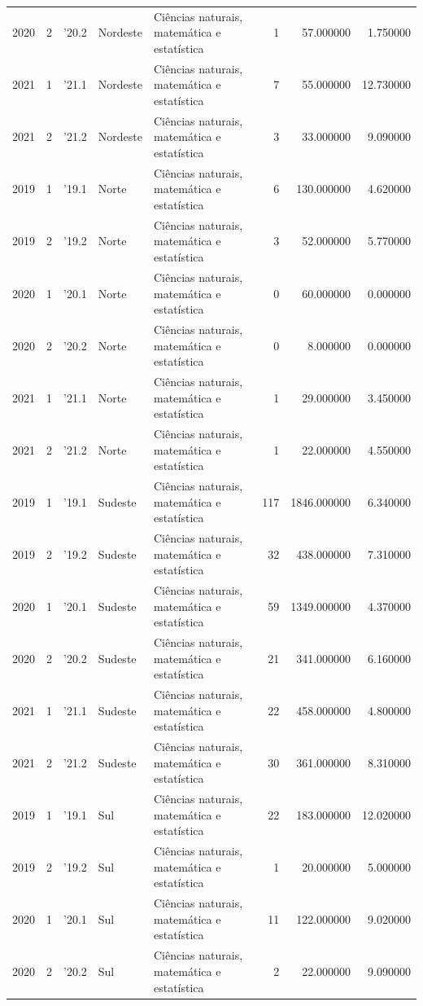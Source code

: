 \begin{longtable}{rrlllrrr}
2020 & 2 & '20.2 & Nordeste & Ciências naturais, matemática e estatística & 1 & 57.000000 & 1.750000 \\
2021 & 1 & '21.1 & Nordeste & Ciências naturais, matemática e estatística & 7 & 55.000000 & 12.730000 \\
2021 & 2 & '21.2 & Nordeste & Ciências naturais, matemática e estatística & 3 & 33.000000 & 9.090000 \\
2019 & 1 & '19.1 & Norte & Ciências naturais, matemática e estatística & 6 & 130.000000 & 4.620000 \\
2019 & 2 & '19.2 & Norte & Ciências naturais, matemática e estatística & 3 & 52.000000 & 5.770000 \\
2020 & 1 & '20.1 & Norte & Ciências naturais, matemática e estatística & 0 & 60.000000 & 0.000000 \\
2020 & 2 & '20.2 & Norte & Ciências naturais, matemática e estatística & 0 & 8.000000 & 0.000000 \\
2021 & 1 & '21.1 & Norte & Ciências naturais, matemática e estatística & 1 & 29.000000 & 3.450000 \\
2021 & 2 & '21.2 & Norte & Ciências naturais, matemática e estatística & 1 & 22.000000 & 4.550000 \\
2019 & 1 & '19.1 & Sudeste & Ciências naturais, matemática e estatística & 117 & 1846.000000 & 6.340000 \\
2019 & 2 & '19.2 & Sudeste & Ciências naturais, matemática e estatística & 32 & 438.000000 & 7.310000 \\
2020 & 1 & '20.1 & Sudeste & Ciências naturais, matemática e estatística & 59 & 1349.000000 & 4.370000 \\
2020 & 2 & '20.2 & Sudeste & Ciências naturais, matemática e estatística & 21 & 341.000000 & 6.160000 \\
2021 & 1 & '21.1 & Sudeste & Ciências naturais, matemática e estatística & 22 & 458.000000 & 4.800000 \\
2021 & 2 & '21.2 & Sudeste & Ciências naturais, matemática e estatística & 30 & 361.000000 & 8.310000 \\
2019 & 1 & '19.1 & Sul & Ciências naturais, matemática e estatística & 22 & 183.000000 & 12.020000 \\
2019 & 2 & '19.2 & Sul & Ciências naturais, matemática e estatística & 1 & 20.000000 & 5.000000 \\
2020 & 1 & '20.1 & Sul & Ciências naturais, matemática e estatística & 11 & 122.000000 & 9.020000 \\
2020 & 2 & '20.2 & Sul & Ciências naturais, matemática e estatística & 2 & 22.000000 & 9.090000 \\

\end{longtable}
